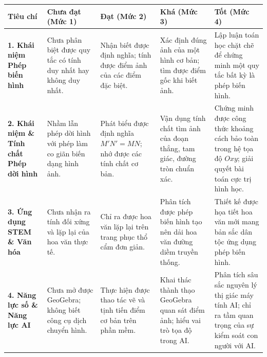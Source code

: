 \documentclass[12pt, a4paper]{article}
\begin{document}
\begin{table}[h!]
\centering
\small
\begin{tabularx}{\textwidth}{|p{2.8cm}|X|X|X|X|}
\hline
\textbf{Tiêu chí} & \textbf{Chưa đạt (Mức 1)} & \textbf{Đạt (Mức 2)} & \textbf{Khá (Mức 3)} & \textbf{Tốt (Mức 4)} \\
\hline
\textbf{1. Khái niệm Phép biến hình} & Chưa phân biệt được quy tắc có tính duy nhất hay không duy nhất. & Nhận biết được định nghĩa; tính được điểm ảnh của các điểm đặc biệt. & Xác định đúng ảnh của một hình cơ bản; tìm được điểm gốc khi biết ảnh. & Lập luận toán học chặt chẽ để chứng minh một quy tắc bất kỳ là phép biến hình. \\
\hline
\textbf{2. Khái niệm \& Tính chất Phép dời hình} & Nhầm lẫn phép dời hình với phép làm co giãn biến dạng hình ảnh. & Phát biểu được định nghĩa $M'N' = MN$; nhớ được các tính chất cơ bản. & Vận dụng tính chất tìm ảnh của đoạn thẳng, tam giác, đường tròn chuẩn xác. & Chứng minh được công thức khoảng cách bảo toàn trong hệ tọa độ $Oxy$; giải quyết bài toán cực trị hình học. \\
\hline
\textbf{3. Ứng dụng STEM \& Văn hóa} & Chưa nhận ra tính đối xứng và lặp lại của hoa văn thực tế. & Chỉ ra được hoa văn lặp lại trên trang phục thổ cẩm đơn giản. & Phân tích được phép biến hình tạo nên dải hoa văn đường diềm truyền thống. & Thiết kế được họa tiết hoa văn mới mang bản sắc dân tộc ứng dụng phép biến hình. \\
\hline
\textbf{4. Năng lực số \& Năng lực AI} & Chưa mở được GeoGebra; không biết công cụ dịch chuyển hình. & Thực hiện được thao tác vẽ và tịnh tiến điểm cơ bản trên phần mềm. & Khai thác thành thạo GeoGebra quan sát điểm ảnh; hiểu vai trò tọa độ trong AI. & Phân tích sâu sắc nguyên lý thị giác máy tính AI; chỉ ra tầm quan trọng của sự kiểm soát con người với AI. \\
\hline
\end{tabularx}
\end{table}
\end{document}
